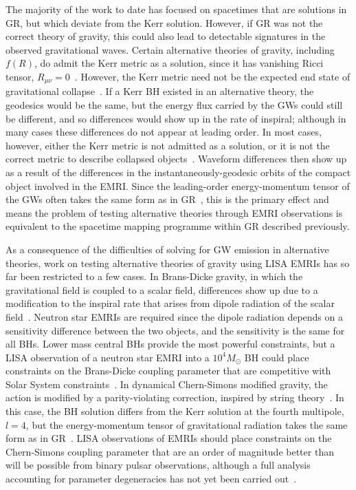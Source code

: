 \documentclass[aps,prd,amsfonts,amssymb,amsmath,nofootinbib,reprint,showpacs]{revtex4-1}
\begin{document}
The majority of the work to date has focused on spacetimes that are solutions in GR, but which deviate from the Kerr solution. However, if GR was not the correct theory of gravity, this could also lead to detectable signatures in the observed gravitational waves. Certain alternative theories of gravity, including $f(R)$, do admit the Kerr metric as a solution, since it has vanishing Ricci tensor, $R_{\mu\nu} = 0$~\cite{Psaltis2008, SYBH}. However, the Kerr metric need not be the expected end state of gravitational collapse~\cite{Barausse2008}. If a Kerr BH existed in an alternative theory, the geodesics would be the same, but the energy flux carried by the GWs could still be different, and so differences would show up in the rate of inspiral; although in many cases these differences do not appear at leading order. In most cases, however, either the Kerr metric is not admitted as a solution, or it is not the correct metric to describe collapsed objects~\cite{SYBH}. Waveform differences then show up as a result of the differences in the instantaneously-geodesic orbits of the compact object involved in the EMRI. Since the leading-order energy-momentum tensor of the GWs often takes the same form as in GR~\cite{Stein2011}, this is the primary effect and means the problem of testing alternative theories through EMRI observations is equivalent to the spacetime mapping programme within GR described previously.

As a consequence of the difficulties of solving for GW emission in alternative theories, work on testing alternative theories of gravity using LISA EMRIs has so far been restricted to a few cases. In Brans-Dicke gravity, in which the gravitational field is coupled to a scalar field, differences show up due to a modification to the inspiral rate that arises from dipole radiation of the scalar field~\cite{Berti2005}. Neutron star EMRIs are required since the dipole radiation depends on a sensitivity difference between the two objects, and the sensitivity is the same for all BHs. Lower mass central BHs provide the most powerful constraints, but a LISA observation of a neutron star EMRI into a $10^4 M_{\odot}$ BH could place constraints on the Brans-Dicke coupling parameter that are competitive with Solar System constraints~\cite{Berti2005}. In dynamical Chern-Simons modified gravity, the action is modified by a parity-violating correction, inspired by string theory~\cite{Alexander2008, Alexander2009a}. In this case, the BH solution differs from the Kerr solution at the fourth multipole, $l = 4$, but the energy-momentum tensor of gravitational radiation takes the same form as in GR~\cite{Sopuerta2009a}. LISA observations of EMRIs should place constraints on the Chern-Simons coupling parameter that are an order of magnitude better than will be possible from binary pulsar observations, although a full analysis accounting for parameter degeneracies has not yet been carried out~\cite{Sopuerta2009a}. 
\end{document}
